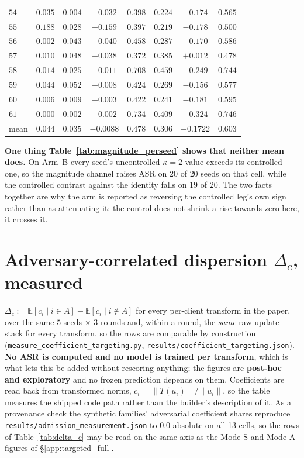 \documentclass{article}
\begin{document}
\begin{table}[h]
\begin{tabular}{lccccccc}
$54$ & $0.035$ & $0.004$ & $-0.032$ & $0.398$ & $0.224$ & $-0.174$ & $0.565$ \\
$55$ & $0.188$ & $0.028$ & $-0.159$ & $0.397$ & $0.219$ & $-0.178$ & $0.500$ \\
$56$ & $0.002$ & $0.043$ & $+0.040$ & $0.458$ & $0.287$ & $-0.170$ & $0.586$ \\
$57$ & $0.010$ & $0.048$ & $+0.038$ & $0.372$ & $0.385$ & $+0.012$ & $0.478$ \\
$58$ & $0.014$ & $0.025$ & $+0.011$ & $0.708$ & $0.459$ & $-0.249$ & $0.744$ \\
$59$ & $0.044$ & $0.052$ & $+0.008$ & $0.424$ & $0.269$ & $-0.156$ & $0.577$ \\
$60$ & $0.006$ & $0.009$ & $+0.003$ & $0.422$ & $0.241$ & $-0.181$ & $0.595$ \\
$61$ & $0.000$ & $0.002$ & $+0.002$ & $0.734$ & $0.409$ & $-0.324$ & $0.746$ \\
\midrule
mean & $0.044$ & $0.035$ & $-0.0088$ & $0.478$ & $0.306$ & $-0.1722$ & $0.603$ \\
\bottomrule
\end{tabular}
\end{table}

\noindent \textbf{One thing Table~\ref{tab:magnitude_perseed} shows that neither mean does.} On Arm~B every seed's
uncontrolled $\kappa{=}2$ value exceeds its controlled one, so the magnitude channel raises ASR on
$20$ of $20$ seeds on that cell, while the controlled contrast against the identity falls on $19$ of
$20$. The two facts together are why the arm is reported as reversing the controlled leg's own sign
rather than as attenuating it: the control does not shrink a rise towards zero here, it crosses it.

\section{Adversary-correlated dispersion $\Delta_c$, measured}
\label{app:delta_c}
\label{sec:rho_vs_deltac}

$\Delta_c := \mathbb{E}[c_i \mid i \in A] - \mathbb{E}[c_i \mid i \notin A]$ for every per-client transform in the paper, over the same $5$ seeds $\times$ $3$ rounds and, within a round, the \emph{same} raw update stack for every transform, so the rows are comparable by construction (\texttt{measure\_coefficient\_targeting.py}, \texttt{results/coefficient\_targeting.json}). \textbf{No ASR is computed and no model is trained per transform}, which is what lets this be added without rescoring anything; the figures are \textbf{post-hoc and exploratory} and no frozen prediction depends on them. Coefficients are read back from transformed norms, $c_i = \|T(u_i)\|/\|u_i\|$, so the table measures the shipped code path rather than the builder's description of it. As a provenance check the synthetic families' adversarial coefficient shares reproduce \texttt{results/admission\_measurement.json} to $0.0$ absolute on all 13 cells, so the rows of Table~\ref{tab:delta_c} may be read on the same axis as the Mode-S and Mode-A figures of §\ref{app:targeted_full}.
\end{document}
